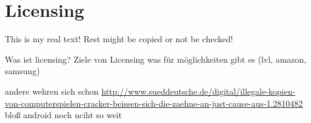 \section{Licensing} \label{section:introduction-licensing}
This is my real text! Rest might be copied or not be checked!


Was ist licensing?\newline
Ziele von Licensing\newline
was für möglichkeiten gibt es (lvl, amazon, samsung)\newline

andere wehren sich schon \url{http://www.sueddeutsche.de/digital/illegale-kopien-von-computerspielen-cracker-beissen-sich-die-zaehne-an-just-cause-aus-1.2810482} bloß android noch nciht so weit
